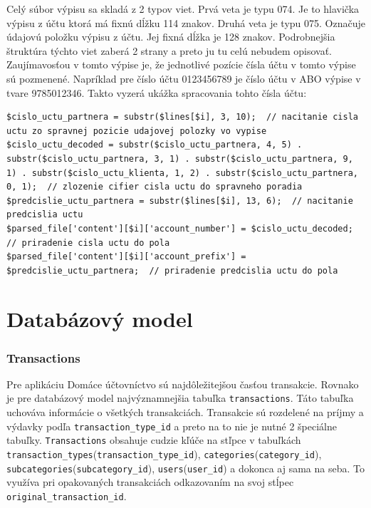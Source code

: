\documentclass[12pt,oneside]{book}
\begin{document}
Celý súbor výpisu sa skladá z 2 typov viet. Prvá veta je typu 074. Je to hlavička výpisu z účtu ktorá má fixnú dĺžku 114 znakov. Druhá veta je typu 075. Označuje údajovú položku výpisu z účtu. Jej fixná dĺžka je 128 znakov. Podrobnejšia štruktúra týchto viet zaberá 2 strany a preto ju tu celú nebudem opisovať. Zaujímavosťou v tomto výpise je, že jednotlivé pozície čísla účtu v tomto výpise sú pozmenené. Napríklad pre číslo účtu 0123456789 je číslo účtu v ABO výpise v tvare 9785012346. Takto vyzerá ukážka spracovania tohto čísla účtu:
\begin{lstlisting}
$cislo_uctu_partnera = substr($lines[$i], 3, 10);  // nacitanie cisla uctu zo spravnej pozicie udajovej polozky vo vypise
$cislo_uctu_decoded = substr($cislo_uctu_partnera, 4, 5) . substr($cislo_uctu_partnera, 3, 1) . substr($cislo_uctu_partnera, 9, 1) . substr($cislo_uctu_klienta, 1, 2) . substr($cislo_uctu_partnera, 0, 1);  // zlozenie cifier cisla uctu do spravneho poradia 
$predcislie_uctu_partnera = substr($lines[$i], 13, 6);  // nacitanie predcislia uctu
$parsed_file['content'][$i]['account_number'] = $cislo_uctu_decoded;  // priradenie cisla uctu do pola
$parsed_file['content'][$i]['account_prefix'] = $predcislie_uctu_partnera;  // priradenie predcislia uctu do pola
\end{lstlisting}


\section{Databázový model}
\subsubsection{Transactions}
Pre aplikáciu Domáce účtovníctvo sú najdôležitejšou časťou transakcie. Rovnako je pre databázový model najvýznamnejšia tabuľka \texttt{transactions}. Táto tabuľka uchováva informácie o všetkých transakciách. Transakcie sú rozdelené na príjmy a výdavky podľa \texttt{transaction\_type\_id} a preto na to nie je nutné 2 špeciálne tabuľky. \texttt{Transactions} obsahuje cudzie kľúče na stľpce v tabuľkách \texttt{transaction\_types}(\texttt{transaction\_\allowbreak type\_\allowbreak id}), \texttt{categories}(\texttt{category\_id}), \texttt{subcategories}(\texttt{subcategory\_id}), \texttt{users}(\texttt{user\_id}) a dokonca aj sama na seba. To využíva pri opakovaných transakciách odkazovaním na svoj stĺpec \texttt{original\_transaction\_id}.
\end{document}
